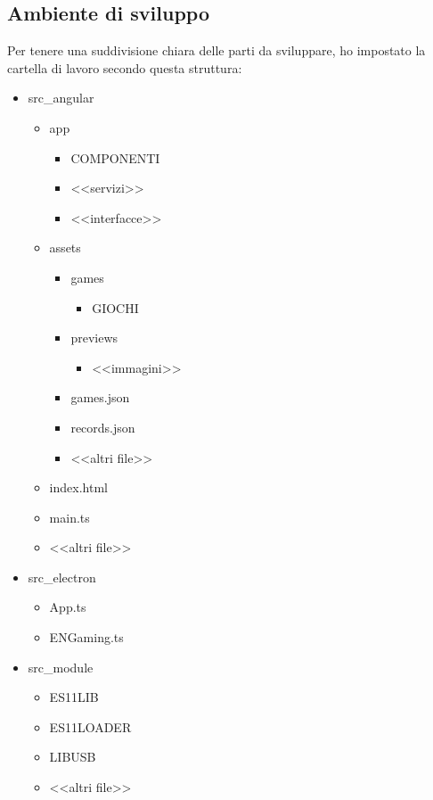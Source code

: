 \subsection{Ambiente di sviluppo}
Per tenere una suddivisione chiara delle parti da sviluppare, ho impostato la cartella di lavoro secondo questa struttura:
\begin{itemize}
    \item src_angular \begin{itemize}
        \item app \begin{itemize}
            \item COMPONENTI
            \item <<servizi>>
            \item <<interfacce>>
        \end{itemize}
        \item assets \begin{itemize}
            \item games \begin{itemize}
                \item GIOCHI
            \end{itemize}
            \item previews \begin{itemize}
                \item <<immagini>>
            \end{itemize}
            \item games.json
            \item records.json
            \item <<altri file>>
        \end{itemize}
        \item index.html
        \item main.ts
        \item <<altri file>>
    \end{itemize}
    \item src_electron \begin{itemize}
        \item App.ts
        \item ENGaming.ts
    \end{itemize}
    \item src_module \begin{itemize}
        \item ES11LIB
        \item ES11LOADER
        \item LIBUSB
        \item <<altri file>>
    \end{itemize}
\end{itemize}
